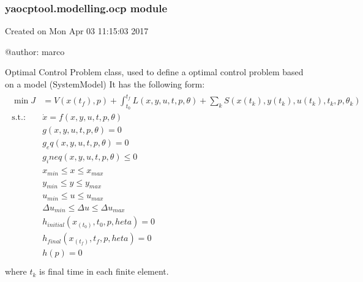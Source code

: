 \documentclass[letterpaper,10pt,english]{sphinxmanual}
\begin{document}
\subsubsection{yaocptool.modelling.ocp module}
\label{\detokenize{yaocptool.modelling:module-yaocptool.modelling.ocp}}\label{\detokenize{yaocptool.modelling:yaocptool-modelling-ocp-module}}
Created on Mon Apr 03 11:15:03 2017

@author: marco

\begin{fulllineitems}
\label{\detokenize{yaocptool.modelling:yaocptool.modelling.ocp.OptimalControlProblem}}
Optimal Control Problem class, used to define a optimal control problem based on a model (SystemModel)
It has the following form:
\begin{align*}\!\begin{aligned}
\min J &= V(x(t_f), p) + \int_{t_0} ^{t_f} L(x,y,u,t,p,\theta)
 + \sum_{k} S(x(t_k), y(t_k), u(t_k), t_k, p, \theta_k)\\
\textrm{s.t.:}\,& \dot{x} = f(x,y,u,t,p,\theta)\\
& g(x,y,u,t,p,\theta) = 0\\
& g_eq (x,y,u,t,p,\theta) = 0\\
& g_ineq(x,y,u,t,p,\theta) \leq 0\\
& x_{min} \leq x \leq x_{max}\\
& y_{min} \leq y \leq y_{max}\\
& u_{min} \leq u \leq u_{max}\\
& \Delta u_{min} \leq \Delta u \leq \Delta u_{max}\\
& h_{initial} (x_(t_0), t_0, p,  heta) = 0\\
& h_{final} (x_(t_f), t_f, p,    heta) = 0\\
& h (p) = 0\\
\end{aligned}\end{align*}
where  \(t_k\) is final time in each finite element.

\begin{fulllineitems}
\label{\detokenize{yaocptool.modelling:yaocptool.modelling.ocp.OptimalControlProblem.__init__}}
\end{fulllineitems}


\end{fulllineitems}
\end{document}

